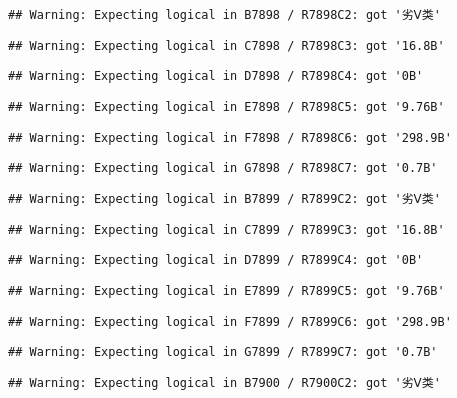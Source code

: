 \documentclass[
]{article}
\begin{document}
\begin{verbatim}
## Warning: Expecting logical in B7898 / R7898C2: got '劣Ⅴ类'
\end{verbatim}

\begin{verbatim}
## Warning: Expecting logical in C7898 / R7898C3: got '16.8B'
\end{verbatim}

\begin{verbatim}
## Warning: Expecting logical in D7898 / R7898C4: got '0B'
\end{verbatim}

\begin{verbatim}
## Warning: Expecting logical in E7898 / R7898C5: got '9.76B'
\end{verbatim}

\begin{verbatim}
## Warning: Expecting logical in F7898 / R7898C6: got '298.9B'
\end{verbatim}

\begin{verbatim}
## Warning: Expecting logical in G7898 / R7898C7: got '0.7B'
\end{verbatim}

\begin{verbatim}
## Warning: Expecting logical in B7899 / R7899C2: got '劣Ⅴ类'
\end{verbatim}

\begin{verbatim}
## Warning: Expecting logical in C7899 / R7899C3: got '16.8B'
\end{verbatim}

\begin{verbatim}
## Warning: Expecting logical in D7899 / R7899C4: got '0B'
\end{verbatim}

\begin{verbatim}
## Warning: Expecting logical in E7899 / R7899C5: got '9.76B'
\end{verbatim}

\begin{verbatim}
## Warning: Expecting logical in F7899 / R7899C6: got '298.9B'
\end{verbatim}

\begin{verbatim}
## Warning: Expecting logical in G7899 / R7899C7: got '0.7B'
\end{verbatim}

\begin{verbatim}
## Warning: Expecting logical in B7900 / R7900C2: got '劣Ⅴ类'
\end{verbatim}
\end{document}
